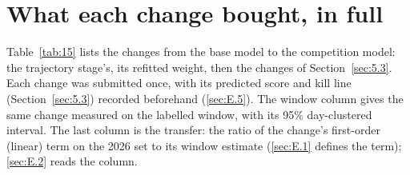\documentclass[
  manuscript=article,
  layout=preprint,
  year=2026,
  volume=x,
]{extra/joas}
\begin{document}
\section{What each change bought, in full}\label{sec:D}

Table~\ref{tab:15} lists the changes from the base model to the competition model: the trajectory stage's, its refitted weight, then the changes of Section~\ref{sec:5.3}. Each change was submitted once, with its predicted score and kill line (Section~\ref{sec:5.3}) recorded beforehand (\ref{sec:E.5}). The window column gives the same change measured on the labelled window, with its 95\% day-clustered interval. The last column is the transfer: the ratio of the change's first-order (linear) term on the 2026 set to its window estimate (\ref{sec:E.1} defines the term); \ref{sec:E.2} reads the column.
\end{document}
